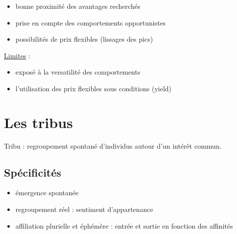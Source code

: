 			\begin{itemize}
				\item bonne proximité des avantages recherchés
				\item prise en compte des comportements opportunistes
				\item possibilités de prix flexibles (lissages des pics)
			\end{itemize}
				\n
			\underline{Limites} :
				
			\begin{itemize}
				\item exposé à la versatilité des comportements
				\item l'utilisation des prix flexibles sous conditions (yield) %
			\end{itemize}
				

			
			
		
		
		
		
		
	\section{Les tribus}
	
	Tribu : regroupement spontané d'individus autour d'un intérêt commun. \\
	
		\subsection{Spécificités}
	
		\begin{itemize}
			\item émergence spontanée
			\item regroupement réel : sentiment d'appartenance
			\item affiliation plurielle et éphémère : entrée et sortie en fonction des affinités
		\end{itemize}
	
